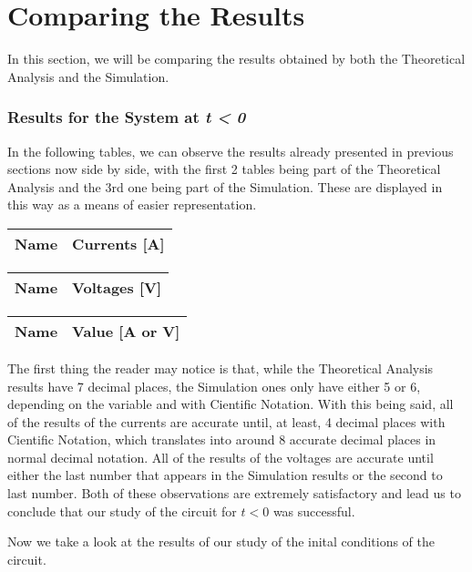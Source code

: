 \section{Comparing the Results}
\label{sec:comparing}

In this section, we will be comparing the results obtained by both the Theoretical Analysis and the Simulation.

\subsubsection{Results for the System at \textit{t < 0}}

In the following tables, we can observe the results already presented in previous sections now side by side, with the first
2 tables being part of the Theoretical Analysis and the 3rd one being part of the Simulation. These are displayed in this
way as a means of easier representation.

\begin{tabular}{|l|r|}
    \hline    
    {\bf Name} & {\bf Currents [A]} \\ \hline
    
\end{tabular}
\quad
\begin{tabular}{|l|r|}
    \hline    
    {\bf Name} & {\bf Voltages [V]} \\ \hline
    
\end{tabular}
\quad
\begin{tabular}{|l|r|}
    \hline    
    {\bf Name} & {\bf Value [A or V]} \\ \hline
    
\end{tabular}

The first thing the reader may notice is that, while the Theoretical Analysis results have 7 decimal places, the Simulation ones only have either 5 or 6, depending on the variable and with Cientific Notation. With this being said, all of the results of the currents are accurate until, at least, 4 decimal places with Cientific Notation, which translates into around 8 accurate decimal places in normal decimal notation. All of the results of the voltages are accurate until either the last number that appears in the Simulation results or the second to last number. Both of these observations are extremely satisfactory and lead us to conclude that our study of the circuit for $t < 0$ was successful.

Now we take a look at the results of our study of the inital conditions of the circuit.

